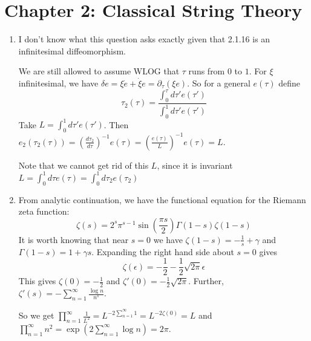 \documentclass[11pt, class=article, crop=false]{standalone}
\begin{document}
	\section*{Chapter 2: Classical String Theory} %
	\label{sec:chapter_2_classical_string_theory}
	\begin{enumerate}
		\item I don't know what this question asks exactly given that 2.1.16 is an infinitesimal diffeomorphism.  
		
		 We are still allowed to assume WLOG that $\tau$ runs from $0$ to $1$. For $\xi$ infinitesimal, we have $\delta e = \xi \dot e + \dot \xi e = \partial_\tau (\xi e)$. So for a general $e(\tau)$ define
		\begin{equation}
			\tau_2(\tau) = \frac{\int_0^\tau d\tau' e(\tau') }{\int_0^1 d\tau' e(\tau')}
		\end{equation} 
		Take $L = \int_0^1 d\tau' e(\tau')$. Then $e_2(\tau_2(\tau)) = \left(\frac{d\tau_2}{d\tau}\right)^{-1} e(\tau) = \left( \frac{e(\tau)}{L} \right)^{-1} e(\tau) = L$.
		
		Note that we cannot get rid of this $L$, since it is invariant $L = \int_0^1 d\tau e(\tau) = \int_0^1 d\tau_2 e(\tau_2)$
		
		
		\item From analytic continuation, we have the functional equation for the Riemann zeta function:
		\begin{equation}
			\zeta(s) = 2^s \pi^{s-1} \sin(\frac{\pi s}{2}) \Gamma(1-s) \zeta(1-s)
		\end{equation}
		It is worth knowing that near $s=0$ we have $\zeta(1-s) = -\frac{1}{s} + \gamma$ and $\Gamma(1-s) = 1 + \gamma s$. Expanding the right hand side about $s = 0$ gives
		\begin{equation}
			\zeta(\epsilon) = -\frac12 - \frac12 \sqrt{2 \pi} \epsilon
		\end{equation}
		This gives $\zeta(0) = -\frac12$ and $\zeta'(0) = -\frac12 \sqrt{2\pi}$. Further, $\zeta'(s) = - \sum_{n=1}^\infty \frac{\log n}{n^s}$. 
		
		So we get $\prod_{n=1}^\infty \frac{1}{L^2} = L^{-2 \sum_{n=1}^\infty 1} = L^{-2 \zeta(0)} = L$ and $\prod_{n=1}^\infty n^2 = \exp\left(2 \sum_{n=1}^\infty \log n \right) = 2\pi$.
		

\end{enumerate}
\end{document}
